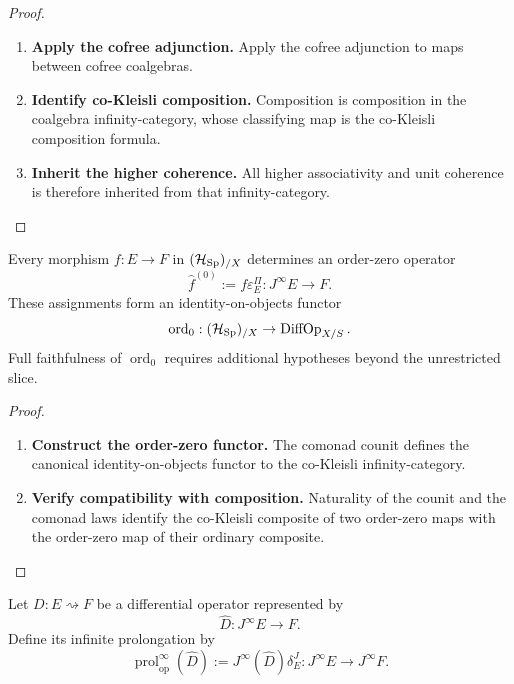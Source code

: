 \begin{proof}
\leavevmode
\begin{enumerate}[label=\textup{(\arabic*)}]
    \item \textbf{Apply the cofree adjunction.}
Apply the cofree adjunction to maps between cofree coalgebras.

    \item \textbf{Identify co-Kleisli composition.}
Composition is
composition in the coalgebra infinity-category, whose classifying map is the co-Kleisli composition formula.

    \item \textbf{Inherit the higher coherence.}
All higher associativity and unit coherence is
therefore inherited from that infinity-category.
\end{enumerate}
\end{proof}

\begin{proposition}
Every morphism \(f:E\to F\) in \((\mathcal H_{\operatorname{Sp}})_{/X}\) determines an order-zero
operator
\[
  \widehat f^{(0)}:=f\varepsilon^\Pi_E:J^\infty E\to F.
\]
These assignments form an identity-on-objects functor
\[
  \operatorname{ord}_0:(\mathcal H_{\operatorname{Sp}})_{/X}\to\operatorname{DiffOp}_{X/S}.
\]
Full faithfulness of \(\operatorname{ord}_0\) requires additional hypotheses beyond the unrestricted slice.
\end{proposition}

\begin{proof}
\leavevmode
\begin{enumerate}[label=\textup{(\arabic*)}]
    \item \textbf{Construct the order-zero functor.}
The comonad counit defines the canonical identity-on-objects functor to the
co-Kleisli infinity-category.

    \item \textbf{Verify compatibility with composition.}
Naturality of the counit and the comonad laws
identify the co-Kleisli composite of two order-zero maps with the order-zero map
of their ordinary composite.
\end{enumerate}
\end{proof}

\begin{definition}
Let \(D:E\rightsquigarrow F\) be a differential operator represented by
\[
  \widehat D:J^\infty E\to F.
\]
Define its infinite prolongation by
\[
  \operatorname{prol}_{\mathrm{op}}^\infty(\widehat D)
  :=
  J^\infty(\widehat D)\delta^J_E:
  J^\infty E\to J^\infty F.
\]
\end{definition}


